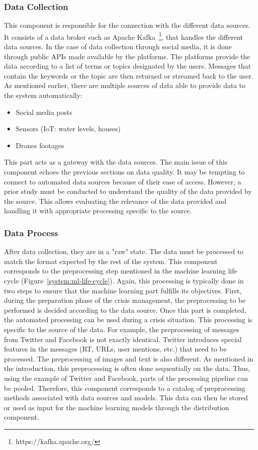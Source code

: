 \subsubsection{Data Collection}
This component is responsible for the connection with the different data sources.
It consists of a data broker such as Apache Kafka~\footnote{https://kafka.apache.org/}, that handles the different data sources.
In the case of data collection through social media, it is done through public APIs made
available by the platforms.
The platforms provide the data according to a list of terms or topics designated by the users.
Messages that contain the keywords or the topic are then returned or streamed back to the user.
As mentioned earlier, there are multiple sources of data able to provide data to the system automatically:

\begin{itemize}
    \item Social media posts
    \item Sensors (IoT: water levels, houses)
    \item Drones footages
\end{itemize}

This part acts as a gateway with the data sources.
The main issue of this component echoes the previous sections on data quality.
It may be tempting to connect to automated data sources because of their ease of access.
However, a prior study must be conducted to understand the quality of the data provided by the source.
This allows evaluating the relevance of the data provided and handling it with appropriate processing specific to the source.

\subsubsection{Data Process}
After data collection, they are in a "raw" state.
The data must be processed to match the format expected by the rest of the system.
This component corresponds to the preprocessing step mentioned in the machine learning life cycle (Figure~\ref{system:ml-life-cycle}).
Again, this processing is typically done in two steps to ensure that the machine learning part fulfills its objectives.
First, during the preparation phase of the crisis management, the preprocessing to be performed is decided according to the data source.
Once this part is completed, the automated processing can be used during a crisis situation.
This processing is specific to the source of the data.
For example, the preprocessing of messages from Twitter and Facebook is not exactly identical.
Twitter introduces special features in the messages (RT, URLs, user mentions, etc.) that need to be processed.
The preprocessing of images and text is also different.
As mentioned in the introduction, this preprocessing is often done sequentially on the data.
Thus, using the example of Twitter and Facebook, parts of the processing pipeline can be pooled.
Therefore, this component corresponds to a catalog of preprocessing methods associated with data sources and models.
This data can then be stored or used as input for the machine learning models through the distribution component.


